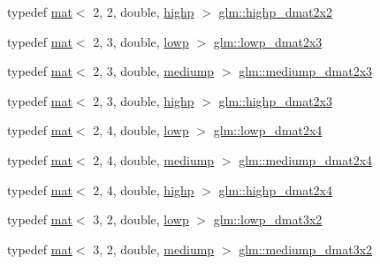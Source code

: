 \begin{DoxyCompactItemize}
\item 
typedef \hyperlink{structglm_1_1mat}{mat}$<$ 2, 2, double, \hyperlink{namespaceglm_a36ed105b07c7746804d7fdc7cc90ff25ac6f7eab42eacbb10d59a58e95e362074}{highp} $>$ \hyperlink{group__core__precision_gad08aec6bf6b5ae7d486fbabb3b28f904}{glm\+::highp\+\_\+dmat2x2}
\item 
typedef \hyperlink{structglm_1_1mat}{mat}$<$ 2, 3, double, \hyperlink{namespaceglm_a36ed105b07c7746804d7fdc7cc90ff25ae161af3fc695e696ce3bf69f7332bc2d}{lowp} $>$ \hyperlink{group__core__precision_gae5263863de4793ff33184db9a6bd3620}{glm\+::lowp\+\_\+dmat2x3}
\item 
typedef \hyperlink{structglm_1_1mat}{mat}$<$ 2, 3, double, \hyperlink{namespaceglm_a36ed105b07c7746804d7fdc7cc90ff25a6416f3ea0c9025fb21ed50c4d6620482}{mediump} $>$ \hyperlink{group__core__precision_gaf3a6e61247ffcbbf9211186d0d250a2b}{glm\+::mediump\+\_\+dmat2x3}
\item 
typedef \hyperlink{structglm_1_1mat}{mat}$<$ 2, 3, double, \hyperlink{namespaceglm_a36ed105b07c7746804d7fdc7cc90ff25ac6f7eab42eacbb10d59a58e95e362074}{highp} $>$ \hyperlink{group__core__precision_gad7de433cb7f79959a191fc5c64fbfc4e}{glm\+::highp\+\_\+dmat2x3}
\item 
typedef \hyperlink{structglm_1_1mat}{mat}$<$ 2, 4, double, \hyperlink{namespaceglm_a36ed105b07c7746804d7fdc7cc90ff25ae161af3fc695e696ce3bf69f7332bc2d}{lowp} $>$ \hyperlink{group__core__precision_ga7832375b36ade5886dd947a2a378d1ac}{glm\+::lowp\+\_\+dmat2x4}
\item 
typedef \hyperlink{structglm_1_1mat}{mat}$<$ 2, 4, double, \hyperlink{namespaceglm_a36ed105b07c7746804d7fdc7cc90ff25a6416f3ea0c9025fb21ed50c4d6620482}{mediump} $>$ \hyperlink{group__core__precision_ga20d1a647a3ef0083e306d026c77ac906}{glm\+::mediump\+\_\+dmat2x4}
\item 
typedef \hyperlink{structglm_1_1mat}{mat}$<$ 2, 4, double, \hyperlink{namespaceglm_a36ed105b07c7746804d7fdc7cc90ff25ac6f7eab42eacbb10d59a58e95e362074}{highp} $>$ \hyperlink{group__core__precision_gaea7c625705d849f1a55c9bfcb2585875}{glm\+::highp\+\_\+dmat2x4}
\item 
typedef \hyperlink{structglm_1_1mat}{mat}$<$ 3, 2, double, \hyperlink{namespaceglm_a36ed105b07c7746804d7fdc7cc90ff25ae161af3fc695e696ce3bf69f7332bc2d}{lowp} $>$ \hyperlink{group__core__precision_gae774d40dc418c39f5ef4dcf4deac0e3c}{glm\+::lowp\+\_\+dmat3x2}
\item 
typedef \hyperlink{structglm_1_1mat}{mat}$<$ 3, 2, double, \hyperlink{namespaceglm_a36ed105b07c7746804d7fdc7cc90ff25a6416f3ea0c9025fb21ed50c4d6620482}{mediump} $>$ \hyperlink{group__core__precision_gaefc11f3917dc7882f4399a47393792fa}{glm\+::mediump\+\_\+dmat3x2}

\end{DoxyCompactItemize}
